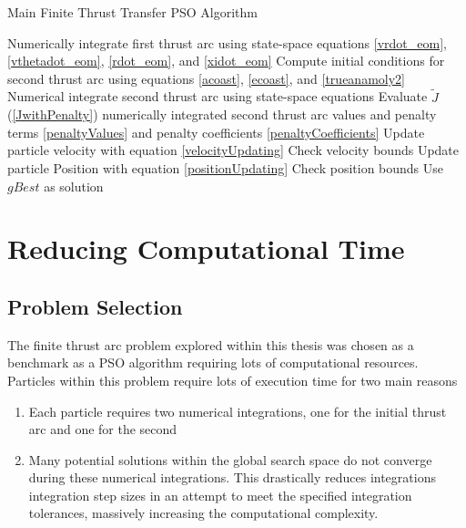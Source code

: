 \begin{algorithm}[H]
    \caption{Main Finite Thrust Transfer PSO Algorithm}
    \begin{algorithmic}

    \STATE Numerically integrate first thrust arc using state-space equations \ref{vrdot_eom},
    \ref{vthetadot_eom}, \ref{rdot_eom}, and \ref{xidot_eom}
    \STATE Compute initial conditions for second thrust arc using equations \ref{acoast}, \ref{ecoast}, and \ref{trueanamoly2}
    \STATE Numerical integrate second thrust arc using state-space equations
    \STATE Evaluate $\tilde{J}$ (\ref{JwithPenalty}) numerically integrated second thrust arc values and penalty terms \ref{penaltyValues} and
    penalty coefficients \ref{penaltyCoefficients}
    \ENDFOR
    \STATE Update particle velocity with equation \ref{velocityUpdating}
    \STATE Check velocity bounds
    \STATE Update particle Position with equation \ref{positionUpdating}
    \STATE Check position bounds
    \ENDFOR
    \ENDFOR
    \STATE Use $gBest$ as solution
    \end{algorithmic}

\end{algorithm}

\section{Reducing Computational Time}

\subsection{Problem Selection} \label{problemSelection}
The finite thrust arc problem explored within this thesis was chosen as a benchmark as a PSO algorithm requiring 
lots of computational resources. Particles within this problem require lots of execution time for two main reasons

\begin{enumerate}
    \item Each particle requires two numerical integrations, one for the initial thrust arc and one for the second
    \item Many potential solutions within the global search space do not converge during these numerical integrations. This drastically reduces integrations
    integration step sizes in an attempt to meet the specified integration tolerances, massively increasing the computational complexity. 
\end{enumerate}

